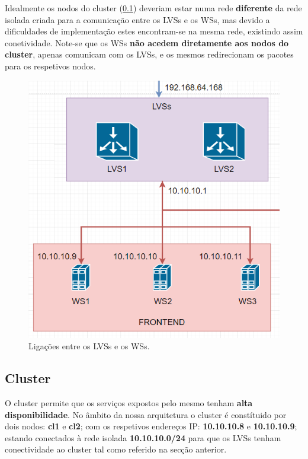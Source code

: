 \hspace{5mm} Idealmente os nodos do cluster (\ref{subsec:cluster}) deveriam estar numa rede \textbf{diferente} da rede isolada criada para a comunicação entre os LVSs e os WSs, mas devido a dificuldades de implementação estes encontram-se na mesma rede, existindo assim conetividade. Note-se que os WSs \textbf{não acedem diretamente aos nodos do cluster}, apenas comunicam com os LVSs, e os mesmos redirecionam os pacotes para os respetivos nodos.

\begin{figure}[H]
	\centering
	\includegraphics[scale=0.5]{imagens/lvs-ws.PNG}
	\caption{Ligações entre os LVSs e os WSs.}
	\label{img:pag}
\end{figure}


\subsection{Cluster} \label{subsec:cluster}

\hspace{5mm} O cluster permite que os serviços expostos pelo mesmo tenham \textbf{alta disponibilidade}. No âmbito da nossa arquitetura o cluster é constítuido por dois nodos: \textbf{cl1} e \textbf{cl2}; com os respetivos endereços IP: \textbf{10.10.10.8} e \textbf{10.10.10.9}; estando conectados à rede isolada \textbf{10.10.10.0/24} para que os LVSs tenham conectividade ao cluster tal como referido na secção anterior.

